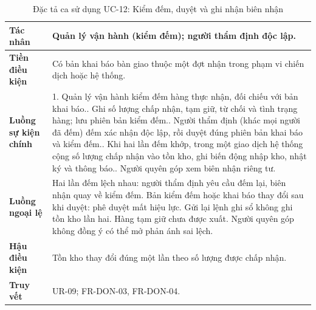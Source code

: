 \documentclass[12pt,a4paper,oneside]{report}
\begin{document}
\begin{table}[H]
  \centering
  \caption{Đặc tả ca sử dụng UC-12: Kiểm đếm, duyệt và ghi nhận biên nhận}\label{tab:uc12-spec}
  \small
  \begin{tabularx}{\textwidth}{|L{3.0cm}|Y|}
    \hline
    \textbf{Tác nhân} & Quản lý vận hành (kiểm đếm); người thẩm định độc lập. \\
    \hline
    \textbf{Tiền điều kiện} & Có bản khai báo bàn giao thuộc một đợt nhận trong phạm vi chiến dịch hoặc hệ thống. \\
    \hline
    \textbf{Luồng sự kiện chính} & 1. Quản lý vận hành kiểm đếm hàng thực nhận, đối chiếu với bản khai báo.. Ghi số lượng chấp nhận, tạm giữ, từ chối và tình trạng hàng; lưu phiên bản kiểm đếm.. Người thẩm định (khác mọi người đã đếm) đếm xác nhận độc lập, rồi duyệt đúng phiên bản khai báo và kiểm đếm.. Khi hai lần đếm khớp, trong một giao dịch hệ thống cộng số lượng chấp nhận vào tồn kho, ghi biến động nhập kho, nhật ký và thông báo.. Người quyên góp xem biên nhận riêng tư. \\
    \hline
    \textbf{Luồng ngoại lệ} & Hai lần đếm lệch nhau: người thẩm định yêu cầu đếm lại, biên nhận quay về kiểm đếm. Bản kiểm đếm hoặc khai báo thay đổi sau khi duyệt: phê duyệt mất hiệu lực. Gửi lại lệnh ghi sổ không ghi tồn kho lần hai. Hàng tạm giữ chưa được xuất. Người quyên góp không đồng ý có thể mở phản ánh sai lệch. \\
    \hline
    \textbf{Hậu điều kiện} & Tồn kho thay đổi đúng một lần theo số lượng được chấp nhận. \\
    \hline
    \textbf{Truy vết} & UR-09; FR-DON-03, FR-DON-04. \\
    \hline
  \end{tabularx}
\end{table}
\end{document}
